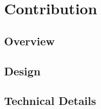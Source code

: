 
\chapter{Contribution}
\label{ch:contribution}

\section{Overview}
\label{sec:contribution:overview}

\kant[21-23]

\section{Design}
\label{sec:contribution:design}

\kant[24-26]

\section{Technical Details}
\label{sec:contribution:technical+details}

\kant[27-29]

